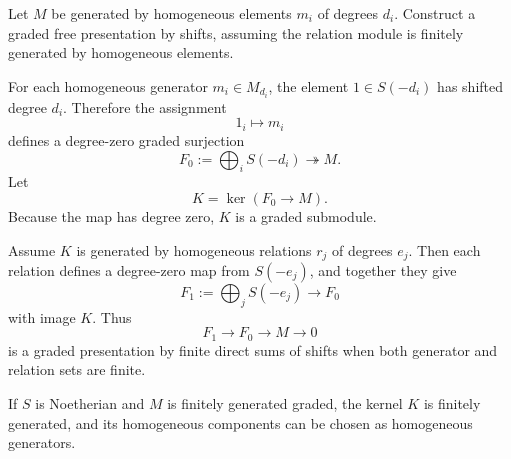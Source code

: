 \begin{problem}\label{prob:vi34-19}
Let \(M\) be generated by homogeneous elements \(m_i\) of degrees \(d_i\). Construct a graded free presentation by
shifts, assuming the relation module is finitely generated by homogeneous elements.

\end{problem}

\ifdefined\FullProblemDossiers
\begin{solution}
For each homogeneous generator \(m_i\in M_{d_i}\), the element \(1\in S(-d_i)\) has shifted degree \(d_i\).
Therefore the assignment
\[
1_i\longmapsto m_i
\]
defines a degree-zero graded surjection
\[
F_0:=\bigoplus_iS(-d_i)\twoheadrightarrow M.
\]
Let
\[
K=\ker(F_0\to M).
\]
Because the map has degree zero, \(K\) is a graded submodule.

Assume \(K\) is generated by homogeneous relations \(r_j\) of degrees \(e_j\). Then each relation defines a
degree-zero map from \(S(-e_j)\), and together they give
\[
F_1:=\bigoplus_jS(-e_j)\longrightarrow F_0
\]
with image \(K\). Thus
\[
\boxed{
F_1\longrightarrow F_0\longrightarrow M\longrightarrow0
}
\]
is a graded presentation by finite direct sums of shifts when both generator and relation sets are finite.

If \(S\) is Noetherian and \(M\) is finitely generated graded, the kernel \(K\) is finitely generated, and its
homogeneous components can be chosen as homogeneous generators.
\end{solution}
\fi
